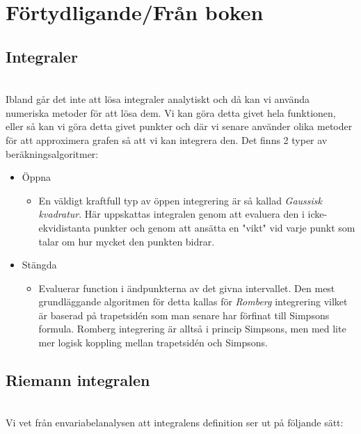 \section{Förtydligande/Från boken}

\subsection{Integraler}\hfill\\

\noindent Ibland går det inte att lösa integraler analytiskt och då kan vi använda numeriska metoder för att lösa dem. Vi kan göra detta givet hela funktionen, eller så kan vi göra detta givet punkter och där vi senare använder olika metoder för att approximera grafen så att vi kan integrera den. Det finns 2 typer av beräkningsalgoritmer:

\begin{itemize}
  \item Öppna
    \begin{itemize}
      \item En väldigt kraftfull typ av öppen integrering är så kallad \textit{Gaussisk kvadratur}. Här uppskattas integralen genom att evaluera den i icke-ekvidistanta punkter och genom att ansätta en "vikt" vid varje punkt som talar om hur mycket den punkten bidrar.
    \end{itemize}
  \item Stängda
    \begin{itemize}
      \item Evaluerar function i ändpunkterna av det givna intervallet. Den mest grundläggande algoritmen för detta kallas för \textit{Romberg} integrering vilket är baserad på trapetsidén som man senare har förfinat till Simpsons formula. Romberg integrering är alltså i princip Simpsons, men med lite mer logisk koppling mellan trapetsidén och Simpsons.
    \end{itemize}
\end{itemize}

\subsection{Riemann integralen}\hfill\\
\noindent Vi vet från envariabelanalysen att integralens definition ser ut på följande sätt:


